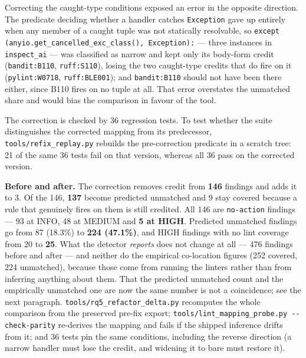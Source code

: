 \documentclass[10pt,a4paper]{article}
\begin{document}
Correcting the caught-type conditions exposed an error in the opposite
direction. The predicate
deciding whether a handler catches \texttt{Exception} gave up entirely when any member
of a caught tuple was not statically resolvable, so
\texttt{except (anyio.get\_cancelled\_exc\_class(), Exception):} --- three instances in
\texttt{inspect\_ai} --- was classified as narrow and kept only its body-form credit
(\texttt{bandit:B110}, \texttt{ruff:S110}), losing the two caught-type credits that
do fire on it (\texttt{pylint:W0718}, \texttt{ruff:BLE001}); and \texttt{bandit:B110}
should not have been there either, since B110 fires on no tuple at all. That error
overstates the unmatched share and would bias the comparison in favour of the tool.

The correction is checked by 36 regression tests. To test whether the suite
distinguishes the corrected mapping from its predecessor,
\texttt{tools/refix\_replay.py} rebuilds the pre-correction predicate
in a scratch tree: 21 of the same 36 tests fail on that version, whereas
all 36 pass on the corrected version.

\textbf{Before and after.} The correction removes credit from \textbf{146} findings and
adds it to 3. Of the 146, \textbf{137} become predicted unmatched and 9 stay covered
because a rule that genuinely fires on them is still credited. All 146 are
\texttt{no-action} findings --- 93 at INFO, 48 at MEDIUM and \textbf{5 at HIGH}.
Predicted unmatched findings go from 87 (18.3\%) to \textbf{224 (47.1\%)}, and HIGH
findings with no lint coverage from 20 to \textbf{25}. What the detector \emph{reports}
does not change at all --- 476 findings before and after --- and neither do the
empirical co-location figures (252 covered, 224 unmatched), because those come from running
the linters rather than from inferring anything about them. That the predicted unmatched
count and the empirically unmatched one are now the same number is not a coincidence; see
the next paragraph.
\texttt{tools/rq5\_refactor\_delta.py} recomputes the whole comparison from the
preserved pre-fix export; \texttt{tools/lint\_mapping\_probe.py -{}-check-parity}
re-derives the mapping and fails if the shipped inference drifts from it; and 36 tests
pin the same conditions, including the reverse direction (a narrow handler must lose the
credit, and widening it to bare must restore it).
\end{document}
